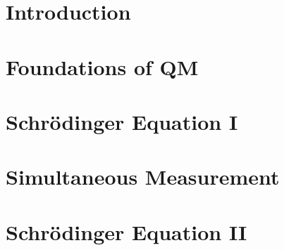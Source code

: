 \documentclass[british,11pt,a4paper]{report}
\begin{document}
\maketitle
\tableofcontents

\chapter{Introduction}

\chapter{Foundations of QM}

\chapter{Schr\"odinger Equation I}

\chapter{Simultaneous Measurement}
\chapter{Schr\"odinger Equation II}
\end{document}
